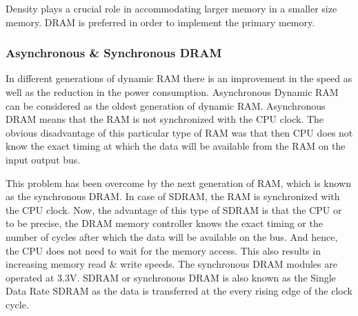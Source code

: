 \begin{highlight}
    Density plays a crucial role in accommodating larger memory in a smaller size memory. DRAM is preferred in order to implement the primary memory.
\end{highlight}

\subsubsection{Asynchronous \& Synchronous DRAM}
In different generations of dynamic RAM there is an improvement in the speed as well as the reduction in the power consumption. Asynchronous Dynamic RAM can be considered as the oldest generation of dynamic RAM. Asynchronous DRAM means that the RAM is not synchronized with the CPU clock. The obvious disadvantage of this particular type of RAM was that then CPU does not know the exact timing at which the data will be available from the RAM on the input output bus. 

\par This problem has been overcome by the next generation of RAM, which is known as the synchronous DRAM. In case of SDRAM, the RAM is synchronized with the CPU clock. Now, the advantage of this type of SDRAM is that the CPU or to be precise, the DRAM memory controller knows the exact timing or the number of cycles after which the data will be available on the bus. And hence, the CPU does not need to wait for the memory access. This also results in increasing memory read \& write speeds. The synchronous DRAM modules are operated at 3.3V. SDRAM or synchronous DRAM is also known as the Single Data Rate SDRAM as the data is transferred at the every rising edge of the clock cycle.


